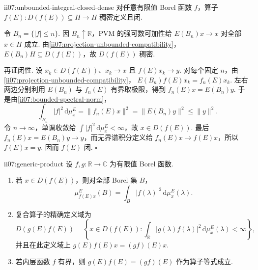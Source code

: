 \begin{FAProposition}[B][无界谱积分定义域稠密且算子闭]{ii07:unbounded-integral-closed-dense}
对任意有限值 Borel 函数 \(\displaystyle f\)，算子
\(\displaystyle f(E):D(f(E))\subseteq H\to H\)
稠密定义且闭.
\end{FAProposition}

\begin{FAProof}
令 \(\displaystyle B_n=\{|f|\leqslant n\}\). 因 \(\displaystyle B_n\uparrow\mathbb R\)，PVM 的强可数可加性给 \(\displaystyle E(B_n)x\to x\) 对全部 \(\displaystyle x\in H\) 成立. 由\autoref{ii07:projection-unbounded-compatibility}，\(\displaystyle E(B_n)H\subseteq D(f(E))\)，故 \(\displaystyle D(f(E))\) 稠密.

再证闭性. 设 \(\displaystyle x_k\in D(f(E))\)、\(\displaystyle x_k\to x\) 且 \(\displaystyle f(E)x_k\to y\). 对每个固定 \(\displaystyle n\)，由\autoref{ii07:projection-unbounded-compatibility}，
\(\displaystyle E(B_n)f(E)x_k=f_n(E)x_k.\)
左右两边分别利用 \(\displaystyle E(B_n)\) 与 \(\displaystyle f_n(E)\) 有界取极限，得到
\(\displaystyle f_n(E)x=E(B_n)y.\)
于是由\autoref{ii07:bounded-spectral-norm}，
\[
\int_{B_n}|f|^2\,\mathrm{d}\mu_x^E
=
\|f_n(E)x\|^2
=
\|E(B_n)y\|^2
\leqslant
\|y\|^2.
\]
令 \(\displaystyle n\to\infty\)，单调收敛给 \(\displaystyle\int|f|^2\,\mathrm{d}\mu_x^E<\infty\)，故 \(\displaystyle x\in D(f(E))\). 最后 \(\displaystyle f_n(E)x=E(B_n)y\to y\)，而无界谱积分定义给 \(\displaystyle f_n(E)x\to f(E)x\)，所以 \(\displaystyle f(E)x=y\). 因而 \(\displaystyle f(E)\) 闭.
\hfill\(\square\)
\end{FAProof}

\begin{FAProposition}[C][无界谱积分的标量测度转移与乘法]{ii07:generic-product}
设 \(\displaystyle f,g:\mathbb R\to\mathbb C\) 为有限值 Borel 函数.
\begin{enumerate}[label=\textnormal{(\roman*)}]
\item 若 \(\displaystyle x\in D(f(E))\)，则对全部 Borel 集 \(\displaystyle B\)，
\[
\mu_{f(E)x}^E(B)
=
\int_B|f(\lambda)|^2\,\mathrm{d}\mu_x^E(\lambda).
\]
\item 复合算子的精确定义域为
\[
D(g(E)f(E))
=
\left\{
 x\in D(f(E)):
 \int_{\mathbb R}|g(\lambda)f(\lambda)|^2\,\mathrm{d}\mu_x^E(\lambda)<\infty
\right\},
\]
并且在此定义域上
\(\displaystyle g(E)f(E)x=(gf)(E)x.\)
\item 若内层函数 \(\displaystyle f\) 有界，则
\(\displaystyle g(E)f(E)=(gf)(E)\)
作为算子等式成立.
\end{enumerate}
\end{FAProposition}

